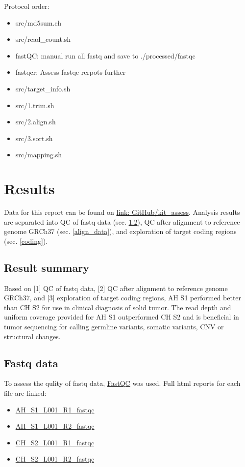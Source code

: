 \documentclass{article}
\begin{document}
Protocol order:
\begin{itemize}
\item src/md5sum.ch
\item src/read\_count.sh
\item fastQC: manual run all fastq and save to ./processed/fastqc
\item fastqcr: Assess fastqc rerpots further
\item src/target\_info.sh
\item src/1.trim.sh
\item src/2.align.sh
\item src/3.sort.sh
\item src/mapping.sh
\end{itemize}

\section{Results}
Data for this report can be found on \href{https://github.com/DylanLawless/kit_assess}{link: GitHub/kit\_assess}. 
Analysis results are separated into QC of fastq data (sec. \ref{fastq_data}), QC after alignment to reference genome GRCh37 (sec. \ref{align_data}), and exploration of target coding regions 
(sec. \ref{coding}).

\subsection{Result summary}
\label{result_summary}

Based on 
[1] QC of fastq data,
[2] QC after alignment to reference genome GRCh37, and 
[3] exploration of target coding regions,
AH S1 performed better than CH S2 for use in clinical diagnosis of solid tumor.
The read depth and uniform coverage provided for AH S1 outperformed CH S2 and is beneficial in tumor sequencing for calling germline variants, somatic variants, CNV or structural changes.

\subsection{Fastq data}
\label{fastq_data}
To assess the qulity of fastq data, \href{https://www.bioinformatics.babraham.ac.uk/projects/fastqc/}{FastQC} was used. 
Full html reports for each file are linked:
\begin{itemize}
	\item \href{https://lawlessgenomics.com/pages/sophia/AH_S1_L001_R1_fastqc.html}{AH\_S1\_L001\_R1\_fastqc}
	\item \href{https://lawlessgenomics.com/pages/sophia/AH_S1_L001_R2_fastqc.html}{AH\_S1\_L001\_R2\_fastqc}
	\item \href{https://lawlessgenomics.com/pages/sophia/CH_S2_L001_R1_fastqc.html}{CH\_S2\_L001\_R1\_fastqc}
	\item \href{https://lawlessgenomics.com/pages/sophia/CH_S2_L001_R2_fastqc.html}{CH\_S2\_L001\_R2\_fastqc}
\end{itemize}
\end{document}
